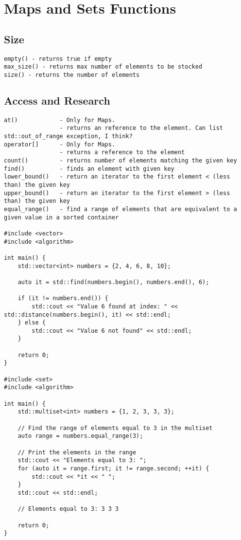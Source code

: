 \documentclass[openany]{report}
\begin{document}
\section{Maps and Sets Functions}

\subsection{Size}

\begin{verbatim}
empty() - returns true if empty
max_size() - returns max number of elements to be stocked
size() - returns the number of elements
\end{verbatim}


\subsection{Access and Research}

\begin{verbatim}
at()            - Only for Maps.
                - returns an reference to the element. Can list std::out_of_range exception, I think? 
operator[]      - Only for Maps.
                - returns a reference to the element
count()         - returns number of elements matching the given key
find()          - finds an element with given key
lower_bound()   - return an iterator to the first element < (less than) the given key
upper_bound()   - return an iterator to the first element > (less than) the given key
equal_range()   - find a range of elements that are equivalent to a given value in a sorted container

#include <vector>
#include <algorithm>

int main() {
    std::vector<int> numbers = {2, 4, 6, 8, 10};

    auto it = std::find(numbers.begin(), numbers.end(), 6);

    if (it != numbers.end()) {
        std::cout << "Value 6 found at index: " << std::distance(numbers.begin(), it) << std::endl;
    } else {
        std::cout << "Value 6 not found" << std::endl;
    }

    return 0;
}

#include <set>
#include <algorithm>

int main() {
    std::multiset<int> numbers = {1, 2, 3, 3, 3};

    // Find the range of elements equal to 3 in the multiset
    auto range = numbers.equal_range(3);

    // Print the elements in the range
    std::cout << "Elements equal to 3: ";
    for (auto it = range.first; it != range.second; ++it) {
        std::cout << *it << " ";
    }
    std::cout << std::endl;

    // Elements equal to 3: 3 3 3

    return 0;
}
\end{verbatim}
\end{document}
